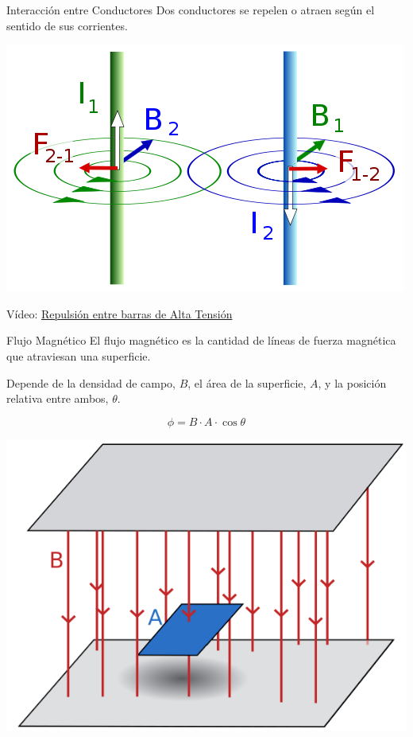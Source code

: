 \documentclass[xcolor={usenames,svgnames,dvipsnames}]{beamer}
\begin{document}
\begin{frame}[label={sec:org8939aeb}]{Interacción entre Conductores}
Dos conductores se repelen o atraen según el sentido de sus corrientes.

\begin{center}
\includegraphics[width=.9\linewidth]{../figs/FuerzasRepulsion.png}
\end{center}
\begin{center}
Vídeo: \href{https://www.youtube.com/watch?v=2j8D\_N1v0tU\&t=0m15s}{Repulsión entre barras de Alta Tensión}
\end{center}
\end{frame}
\begin{frame}[label={sec:org6607359}]{Flujo Magnético}
El flujo magnético es la cantidad de líneas de fuerza magnética que atraviesan una superficie. 

Depende de la densidad de campo, \(B\), el área de la superficie, \(A\), y la posición relativa entre ambos, \(\theta\).

\[
\phi = B \cdot A \cdot \cos \theta
\]
\begin{center}
\includegraphics[height=0.4\textheight]{../figs/flujo_magnetico.pdf}
\end{center}
\end{frame}
\end{document}
